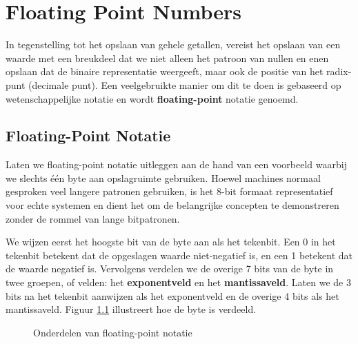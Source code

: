 \chapter{Floating Point Numbers}\label{app:floats }
In tegenstelling tot het opslaan van gehele getallen, vereist het opslaan van een waarde met een breukdeel dat we niet alleen het patroon van nullen en enen opslaan dat de binaire representatie weergeeft, maar ook de positie van het radix-punt (decimale punt). Een veelgebruikte manier om dit te doen is gebaseerd op wetenschappelijke notatie en wordt \textbf{floating-point} notatie genoemd.

\section*{Floating-Point Notatie}
Laten we floating-point notatie uitleggen aan de hand van een voorbeeld waarbij we slechts één byte aan opslagruimte gebruiken. Hoewel machines normaal gesproken veel langere patronen gebruiken, is het 8-bit formaat representatief voor echte systemen en dient het om de belangrijke concepten te demonstreren zonder de rommel van lange bitpatronen.

We wijzen eerst het hoogste bit van de byte aan als het tekenbit. Een 0 in het tekenbit betekent dat de opgeslagen waarde niet-negatief is, en een 1 betekent dat de waarde negatief is. Vervolgens verdelen we de overige 7 bits van de byte in twee groepen, of velden: het \textbf{exponentveld} en het \textbf{mantissaveld}. Laten we de 3 bits na het tekenbit aanwijzen als het exponentveld en de overige 4 bits als het mantissaveld. Figuur \ref{fig:float:notation } illustreert hoe de byte is verdeeld.
\begin{figure}[ht]
\centering
{}
\caption{Onderdelen van floating-point notatie}
\label{fig:float:notation }
\end{figure}

